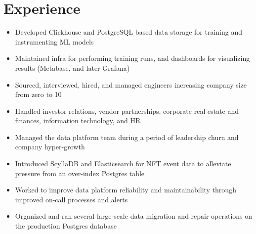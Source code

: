\documentclass[11pt,letterpaper,sans]{moderncv}        %
\begin{document}
\makecvtitle

\vspace{-10mm}

\section{Experience}

\vspace*{-4pt}
\begin{itemize}
\item Developed Clickhouse and PostgreSQL based data storage for training and instrumenting ML models
\item Maintained infra for performing training runs, and dashboards for visualizing results (Metabase, and later Grafana)
\item Sourced, interviewed, hired, and managed engineers increasing company size from zero to 10
\item Handled investor relations, vendor partnerships, corporate real estate and finances, information technology, and HR
\end{itemize}
\vspace*{4pt}

\vspace*{-4pt}
\begin{itemize}
\item Managed the data platform team during a period of leadership churn and company hyper-growth
\item Introduced ScyllaDB and Elasticsearch for NFT event data to alleviate pressure from an over-index Postgres table
\item Worked to improve data platform reliability and maintainability through improved on-call processes and alerts
\item Organized and ran several large-scale data migration and repair operations on the production Postgres database
\end{itemize}
\vspace*{4pt}
\end{document}
